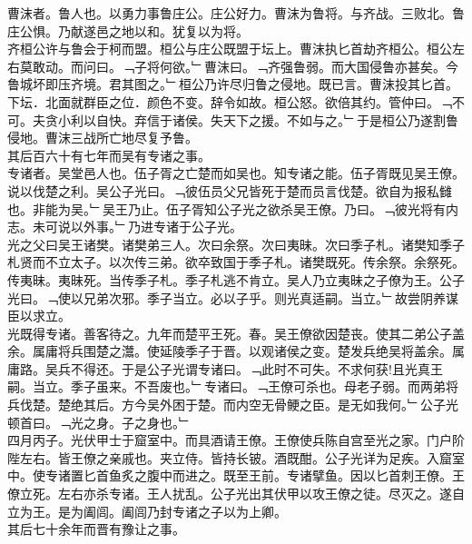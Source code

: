 \documentclass{zhvt-classic}
\begin{document}

\hspace*{2em}曹沫者。鲁人也。以勇力事鲁庄公。庄公好力。曹沫为鲁将。与齐战。三败北。鲁庄公惧。乃献遂邑之地以和。犹复以为将。\\
\hspace*{2em}齐桓公许与鲁会于柯而盟。桓公与庄公既盟于坛上。曹沫执匕首劫齐桓公。桓公左右莫敢动。而问曰。﹁子将何欲。﹂曹沫曰。﹁齐强鲁弱。而大国侵鲁亦甚矣。今鲁城坏即压齐境。君其图之。﹂桓公乃许尽归鲁之侵地。既已言。曹沫投其匕首。下坛．北面就群臣之位．颜色不变。辞令如故。桓公怒。欲倍其约。管仲曰。﹁不可。夫贪小利以自快。弃信于诸侯。失天下之援。不如与之。﹂于是桓公乃遂割鲁侵地。曹沫三战所亡地尽复予鲁。\\
\hspace*{2em}其后百六十有七年而吴有专诸之事。\\
\hspace*{2em}专诸者。吴堂邑人也。伍子胥之亡楚而如吴也。知专诸之能。伍子胥既见吴王僚。说以伐楚之利。吴公子光曰。﹁彼伍员父兄皆死于楚而员言伐楚。欲自为报私雠也。非能为吴。﹂吴王乃止。伍子胥知公子光之欲杀吴王僚。乃曰。﹁彼光将有内志。未可说以外事。﹂乃进专诸于公子光。\\
\hspace*{2em}光之父曰吴王诸樊。诸樊弟三人。次曰余祭。次曰夷昧。次曰季子札。诸樊知季子札贤而不立太子。以次传三弟。欲卒致国于季子札。诸樊既死。传余祭。余祭死。传夷昧。夷昧死。当传季子札。季子札逃不肯立。吴人乃立夷昧之子僚为王。公子光曰。﹁使以兄弟次邪。季子当立。必以子乎。则光真适嗣。当立。﹂故尝阴养谋臣以求立。\\
\hspace*{2em}光既得专诸。善客待之。九年而楚平王死。春。吴王僚欲因楚丧。使其二弟公子盖余。属庸将兵围楚之灊。使延陵季子于晋。以观诸侯之变。楚发兵绝吴将盖余。属庸路。吴兵不得还。于是公子光谓专诸曰。﹁此时不可失。不求何获!且光真王嗣。当立。季子虽来。不吾废也。﹂专诸曰。﹁王僚可杀也。母老子弱。而两弟将兵伐楚。楚绝其后。方今吴外困于楚。而内空无骨鲠之臣。是无如我何。﹂公子光顿首曰。﹁光之身。子之身也。﹂\\
\hspace*{2em}四月丙子。光伏甲士于窟室中。而具酒请王僚。王僚使兵陈自宫至光之家。门户阶陛左右。皆王僚之亲戚也。夹立侍。皆持长铍。酒既酣。公子光详为足疾。入窟室中。使专诸置匕首鱼炙之腹中而进之。既至王前。专诸擘鱼。因以匕首刺王僚。王僚立死。左右亦杀专诸。王人扰乱。公子光出其伏甲以攻王僚之徒。尽灭之。遂自立为王。是为阖闾。阖闾乃封专诸之子以为上卿。\\
\hspace*{2em}其后七十余年而晋有豫让之事。\\
\end{document}
